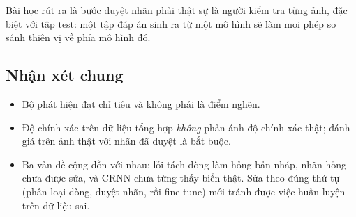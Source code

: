 Bài học rút ra là bước duyệt nhãn phải thật sự là người kiểm tra từng ảnh, đặc biệt với tập test: một tập đáp án sinh ra từ một mô hình sẽ làm mọi phép so sánh thiên vị về phía mô hình đó.

\subsection{Nhận xét chung}
\begin{itemize}[nosep]
  \item Bộ phát hiện đạt chỉ tiêu và không phải là điểm nghẽn.
  \item Độ chính xác trên dữ liệu tổng hợp \emph{không} phản ánh độ chính xác thật; đánh giá trên ảnh thật với nhãn đã duyệt là bắt buộc.
  \item Ba vấn đề cộng dồn với nhau: lỗi tách dòng làm hỏng bản nháp, nhãn hỏng chưa được sửa, và CRNN chưa từng thấy biển thật. Sửa theo đúng thứ tự (phân loại dòng, duyệt nhãn, rồi fine-tune) mới tránh được việc huấn luyện trên dữ liệu sai.
\end{itemize}

